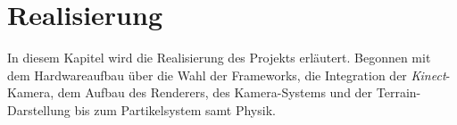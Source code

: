 \chapter{Realisierung}
\begin{Spacing}{\mylinespace}

In diesem Kapitel wird die Realisierung des Projekts erläutert. Begonnen mit dem Hardwareaufbau über die Wahl der Frameworks, die Integration der \textit{Kinect}-Kamera, dem Aufbau des Renderers, des Kamera-Systems und der Terrain-Darstellung bis zum Partikelsystem samt Physik.  \\


\clearpage

\clearpage

\clearpage

\clearpage

\clearpage

\clearpage

\clearpage

\clearpage

\end{Spacing}
\newpage
\clearpage
